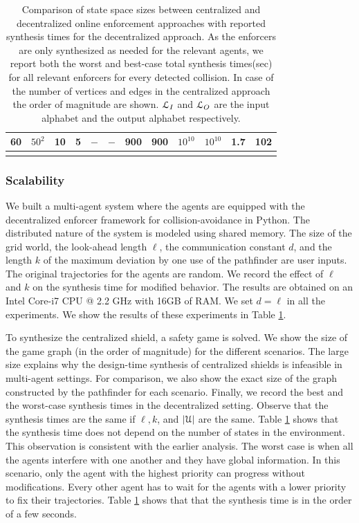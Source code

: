 \begin{table}[!t]
\begin{tabular}{cccccccccccc}
\rowcolor[rgb]{0.925,0.957,1} 60 & $50^2$  & 10        & 5       & $-$         & $-$                                                                      & 900    & 900                                                                                   & $10^{10}$    & $10^{10}$    & 1.7    & 102 \\
\bottomrule \\
\end{tabular}
\caption{Comparison of state space sizes between centralized and decentralized online enforcement approaches with reported synthesis times for the decentralized approach. As the enforcers are only synthesized as needed for the relevant agents, we report both the worst and best-case total synthesis times(sec) for all relevant enforcers for every detected collision. In case of the number of vertices and edges in the centralized approach the order of magnitude are shown. $\mathcal{L}_I$ and $\mathcal{L}_O$ are the input alphabet and the output alphabet respectively.}
\label{tab:fullresults}
\end{table}

\subsubsection*{Scalability}


We built a multi-agent system where the agents are equipped with the decentralized enforcer framework for collision-avoidance in Python. The distributed nature of the system is modeled using shared memory. The size of the grid world, the look-ahead length $\ell$, the communication constant $d$, and the length $k$ of the maximum deviation by one use of the pathfinder are user inputs. The original trajectories for the agents are random. We record the effect of $\ell$ and $k$ on the synthesis time for modified behavior. 
The results are obtained on an Intel Core-i7 CPU @ 2.2 GHz with 16GB of RAM. We set $d = \ell$ in all the experiments. We show the results of these experiments in Table \ref{tab:fullresults}. 

To synthesize the centralized shield, a safety game is solved. We show the size of the game graph (in the order of magnitude) for the different scenarios.  The large size explains why the design-time synthesis of centralized shields is infeasible in multi-agent settings.
For comparison, we also show the exact size of the graph constructed by the pathfinder for each scenario. Finally, we record the best and the worst-case synthesis times in the decentralized setting. Observe that the synthesis times are the same if $\ell,k$, and $|\mathcal{U}|$ are the same. 
Table \ref{tab:fullresults} shows that the synthesis time does not depend on the number of states in the environment. This observation is consistent with the earlier analysis. The worst case is when all the agents interfere with one another and they have global information. In this scenario, only the agent with the highest priority can progress without modifications. Every other agent has to wait for the agents with a lower priority to fix their trajectories. Table \ref{tab:fullresults} shows that that the synthesis time is in the order of a few seconds. 


